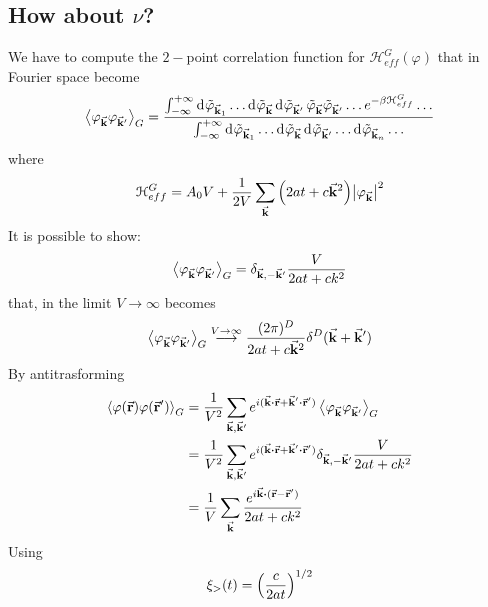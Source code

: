 \documentclass[../main/main.tex]{subfiles}
\begin{document}
\subsection{How about \( \nu  \)?}
We have to compute the \( 2- \)point correlation function for \( \mathcal{H}_{eff}^G (\varphi ) \) that in Fourier space become
\begin{equation}
  \expval{\varphi _{\va{k}} \varphi _{\va{k}'}}_G =
\frac{\int_{- \infty }^{+ \infty } \dd[]{ \tilde{ \varphi} _{\va{k}_1} }  \dots
  \dd[]{ \tilde{ \varphi} _{\va{k}} }  \dd[]{ \tilde{ \varphi} _{\va{k}'} }
 \tilde{\varphi} _{\va{k}} \tilde{\varphi} _{\va{k}'} \dots
  e^{- \beta \mathcal{H}_{eff}^G}  \dots
 }{
 \int_{- \infty }^{+ \infty } \dd[]{ \tilde{ \varphi} _{\va{k}_1} }  \dots
   \dd[]{ \tilde{ \varphi} _{\va{k}} }  \dd[]{ \tilde{ \varphi} _{\va{k}'} } \dots
   \dd[]{ \tilde{ \varphi} _{\va{k}_n} } \dots
 }
\end{equation}
where
\begin{equation}
  \mathcal{H}_{eff}^G = A_0 V + \frac{1}{2V} \sum_{\va{k}}^{} \qty(2 a t + c \va{k}^2) \abs{\varphi _{\va{k}}}^2
\end{equation}
It is possible to show:
\begin{equation}
  \expval{\varphi _{\va{k}} \varphi _{\va{k}'}}_G = \delta _{\va{k},-\va{k}'} \frac{V}{2 a t + c k^2}
\end{equation}
that, in the limit \( V \rightarrow \infty  \) becomes
\begin{equation}
    \expval{\varphi _{\va{k}} \varphi _{\va{k}'}}_G \overset{V \rightarrow \infty }{\longrightarrow} \frac{(2 \pi )^D}{2 a t + c \va{k}^2} \delta ^D (\va{k}+ \va{k}')
\end{equation}
By antitrasforming
\begin{equation}
\begin{split}
  \expval{\varphi (\va{r}) \varphi (\va{r}')}_G &= \frac{1}{V^2} \sum_{\va{k}, \va{k}'}^{} e^{i (\va{k}\vdot \va{r} + \va{k}' \vdot \va{r}' )} \expval{\varphi _{\va{k}} \varphi _{\va{k}'}}_G    \\
  & = \frac{1}{V^2} \sum_{\va{k}, \va{k}'}^{} e^{i (\va{k}\vdot \va{r} + \va{k}' \vdot \va{r}' )}  \delta _{\va{k}, -\va{k}'} \frac{V}{2at+ck^2} \\
  & = \frac{1}{V} \sum_{\va{k}}^{} \frac{ e^{i \va{k}\vdot ( \va{r} - \va{r}' )}}{2 a t + c k^2}
\end{split}
\end{equation}
Using
\begin{equation}
  \xi _> (t) = \qty(\frac{c}{2at})^{1/2}
\end{equation}
\end{document}
